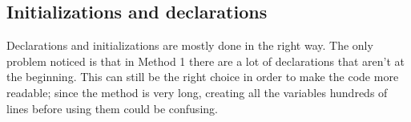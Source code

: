 \subsection{Initializations and declarations}

Declarations and initializations are mostly done in the right way. The only problem noticed is that in Method 1 there are a lot of declarations that aren't at the beginning. 
This can still be the right choice in order to make the code more readable; since the method is very long, creating all the variables hundreds of lines before using them could be
confusing.